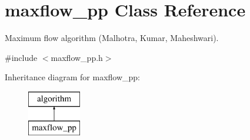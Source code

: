 \hypertarget{classmaxflow__pp}{}\section{maxflow\+\_\+pp Class Reference}
\label{classmaxflow__pp}


Maximum flow algorithm (Malhotra, Kumar, Maheshwari).  




{\ttfamily \#include $<$maxflow\+\_\+pp.\+h$>$}

Inheritance diagram for maxflow\+\_\+pp\+:\begin{figure}[H]
\begin{center}
\leavevmode
\includegraphics[height=2.000000cm]{classmaxflow__pp}
\end{center}
\end{figure}
